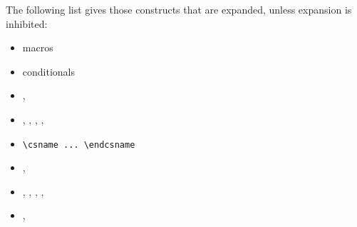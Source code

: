 \documentclass[twoside,letterpaper,openright]{rapport3}
\begin{document}
The following list gives those constructs
that are expanded, unless
expansion is inhibited:
\begin{itemize}
\item macros\label{expand:lijst}
\item conditionals
\item {}, 
\item {}, , , 
      , 
\item \verb,\csname ... \endcsname,
\item {}, 
\item {}, , , 
      , 
\item {}, 
\end{itemize}
\end{document}

